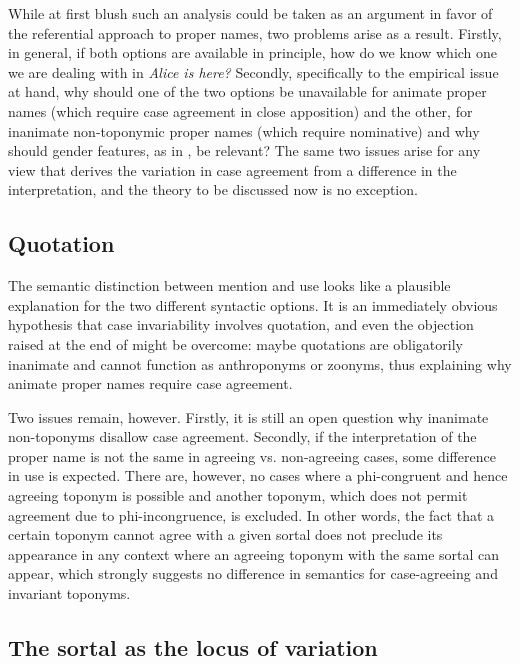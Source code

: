 \documentclass[output=paper,colorlinks,citecolor=brown]{langscibook}
\begin{document}
\z

\noindent While at first blush such an analysis could be taken as an argument in favor of the referential approach to proper names, two problems arise as a result. Firstly, in general, if both options are available in principle, how do we know which one we are dealing with in \textit{Alice is here?} Secondly, specifically to the empirical issue at hand, why should one of the two options be unavailable for animate proper names (which require case agreement in close apposition) and the other, for inanimate non-toponymic proper names (which require nominative) and why should gender features, as in , be relevant? The same two issues arise for any view that derives the variation in case agreement from a difference in the interpretation, and the theory to be discussed now is no exception.

\subsection{Quotation}\label{mat:sec:quotation}

The semantic distinction between mention and use looks like a plausible explanation for the two different syntactic options. It is an immediately obvious hypothesis that case invariability involves quotation, and even the objection raised at the end of  might be overcome: maybe quotations are obligatorily inanimate and cannot function as anthroponyms or zoonyms, thus explaining why animate proper names require case agreement.

Two issues remain, however. Firstly, it is still an open question why inanimate non-toponyms disallow case agreement. Secondly, if the interpretation of the proper name is not the same in agreeing vs. non-agreeing cases, some difference in use is expected. There are, however, no cases where a phi-congruent and hence agreeing toponym is possible and another toponym, which does not permit agreement due to phi-incongruence, is excluded. In other words, the fact that a certain toponym cannot agree with a given sortal does not preclude its appearance in any context where an agreeing toponym with the same sortal can appear, which strongly suggests no difference in semantics for case-agreeing and invariant toponyms.

\subsection{The sortal as the locus of variation}\label{mat:sec:sortalAs-locus-of-variation}
\end{document}
